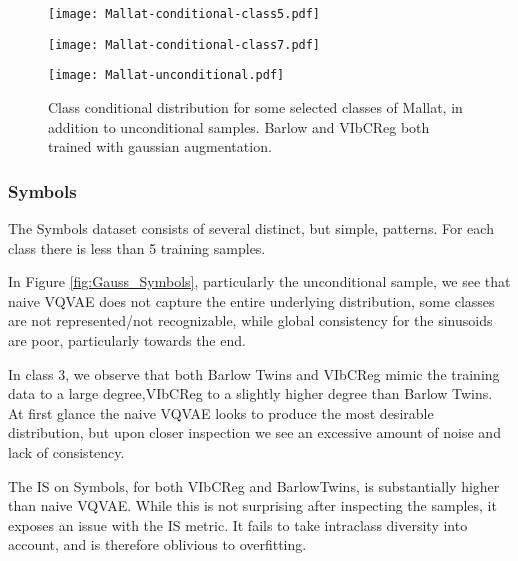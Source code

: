 \documentclass[../../thesis.tex]{subfiles}
\begin{document}
\begin{figure}[H]
    \centering
    \begin{minipage}[b]{0.32\textwidth}
        \centering
        \texttt{[image: Mallat-conditional-class5.pdf]}
    \end{minipage}
    \begin{minipage}[b]{0.32\textwidth}
        \centering
        \texttt{[image: Mallat-conditional-class7.pdf]}
    \end{minipage}
    \begin{minipage}[b]{0.32\textwidth}
        \centering
        \texttt{[image: Mallat-unconditional.pdf]}
    \end{minipage}
    \caption{Class conditional distribution for some selected classes of Mallat, in addition to unconditional samples. Barlow and VIbCReg both trained with gaussian augmentation.}
    \label{fig:Gaussian_Mallat}
\end{figure}


\subsubsection{Symbols}

The Symbols dataset consists of several distinct, but simple, patterns. For each class there is less than 5 training samples.

In Figure \ref{fig:Gauss_Symbols}, particularly the unconditional sample, we see that naive VQVAE does not capture the entire underlying distribution, some classes are not represented/not recognizable, while global consistency for the sinusoids are poor, particularly towards the end.\newline

In class 3, we observe that both Barlow Twins and VIbCReg mimic the training data to a large degree,VIbCReg to a slightly higher degree than Barlow Twins. At first glance the naive VQVAE looks to produce the most desirable distribution, but upon closer inspection we see an excessive amount of noise and lack of consistency.\newline

The IS on Symbols, for both VIbCReg and BarlowTwins, is substantially higher than naive VQVAE. While this is not surprising after inspecting the samples, it exposes an issue with the IS metric. It fails to take intraclass diversity into account, and is therefore oblivious to overfitting. \newline
\end{document}
